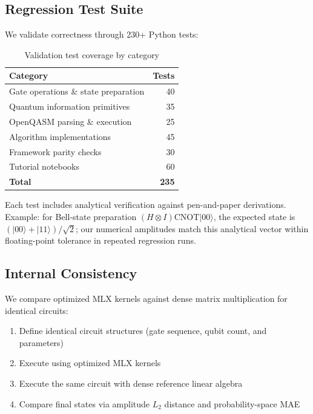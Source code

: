 \documentclass[runningheads]{llncs}
\begin{document}
\subsection{Regression Test Suite}

We validate correctness through 230+ Python tests:

\begin{table}[t]
\caption{Validation test coverage by category}
\label{tab:tests}
\centering
\begin{tabular}{lr}
\toprule
Category & Tests \\
\midrule
Gate operations \& state preparation & 40 \\
Quantum information primitives & 35 \\
OpenQASM parsing \& execution & 25 \\
Algorithm implementations & 45 \\
Framework parity checks & 30 \\
Tutorial notebooks & 60 \\
\midrule
\textbf{Total} & \textbf{235} \\
\bottomrule
\end{tabular}
\end{table}

Each test includes analytical verification against pen-and-paper derivations. Example: for Bell-state preparation $(H \otimes I)\mathrm{CNOT}|00\rangle$, the expected state is $(|00\rangle + |11\rangle)/\sqrt{2}$; our numerical amplitudes match this analytical vector within floating-point tolerance in repeated regression runs.

\subsection{Internal Consistency}

We compare optimized MLX kernels against dense matrix multiplication for identical circuits:

\begin{enumerate}
    \item Define identical circuit structures (gate sequence, qubit count, and parameters)
    \item Execute using optimized MLX kernels
    \item Execute the same circuit with dense reference linear algebra
    \item Compare final states via amplitude $L_2$ distance and probability-space MAE
\end{enumerate}
\end{document}
